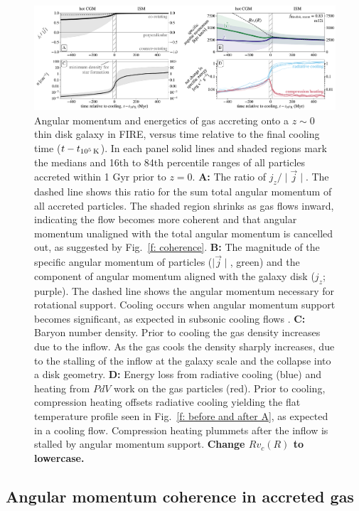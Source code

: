 \documentclass[fleqn,usenatbib]{mnras}
\newcommand{\tcon}{t_{10^5\,{\rm K}}}
\begin{document}
\begin{figure}
\includegraphics[width=\textwidth]{figures/before_and_after/before_and_after_m12i_md.pdf}
\caption{
Angular momentum and energetics of gas accreting onto a $z\sim0$ thin disk galaxy in FIRE, versus time relative to the final cooling time ($t - \tcon$).
In each panel solid lines and shaded regions mark the medians and 16th to 84th percentile ranges of all particles accreted within 1 Gyr prior to $z=0$.
\textbf{A:}
The ratio of $j_z / \mid \vec j \mid$.
The dashed line shows this ratio for the sum total angular momentum of all accreted particles.
The shaded region shrinks as gas flows inward, indicating the flow becomes more coherent and that angular momentum unaligned with the total angular momentum is cancelled out, as suggested by Fig.~\ref{f: coherence}. 
\textbf{B:}
The magnitude of the specific angular momentum of particles ($\mid\vec{j}\mid$, green) and the component of angular momentum aligned with the galaxy disk ($j_z$; purple).
The dashed line shows the angular momentum necessary for rotational support.
Cooling occurs when angular momentum support becomes significant, as expected in subsonic cooling flows \citep{Cowie1980, Stern2019}.
\textbf{C:}
Baryon number density.
Prior to cooling the gas density increases due to the inflow.
As the gas cools the density sharply increases, due to the stalling of the inflow at the galaxy scale and the collapse into a disk geometry. 
\textbf{D:}
Energy loss from radiative cooling (blue) and heating from $PdV$ work on the gas particles (red).
Prior to cooling, compression heating offsets radiative cooling yielding the flat temperature profile seen in Fig.~\ref{f: before and after A}, as expected in a cooling flow.
Compression heating plummets after the inflow is stalled by angular momentum support.
\textbf{Change $Rv_c(R)$ to lowercase.}
}
\label{f: before and after B}
\end{figure}

\subsection{Angular momentum coherence in accreted gas}
\label{s: mechanics -- coherence}
\end{document}
